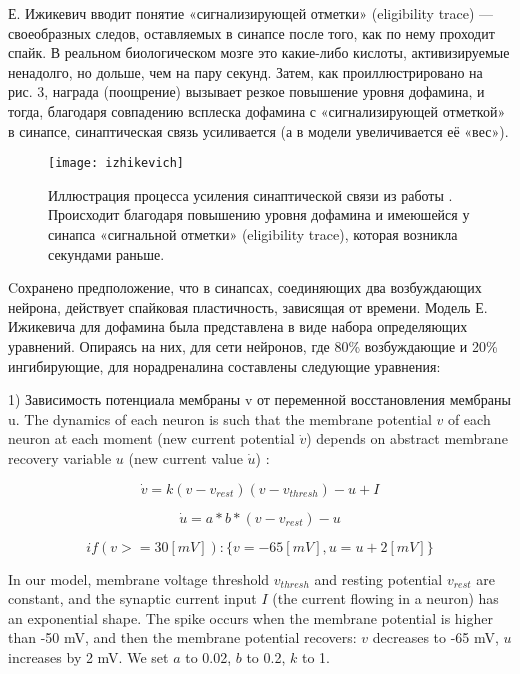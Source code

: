 Е. Ижикевич вводит понятие «сигнализирующей отметки» (eligibility trace) — своеобразных следов, оставляемых в синапсе после того, как по нему проходит спайк. В реальном биологическом мозге это какие-либо кислоты, активизируемые ненадолго, но дольше, чем на пару секунд. Затем, как проиллюстрировано на рис. 3, награда (поощрение) вызывает резкое повышение уровня дофамина, и тогда, благодаря совпадению всплеска дофамина с «сигнализирующей отметкой» в синапсе, синаптическая связь усиливается (а в модели увеличивается её «вес»).


\begin{figure}
	\centering
	\texttt{[image: izhikevich]}
	\caption{Иллюстрация процесса усиления синаптической связи из работы \cite{izh}. Происходит благодаря повышению уровня дофамина и имеюшейся у синапса «сигнальной отметки» (eligibility trace), которая возникла секундами раньше.}
	\label{fig:sample_figure}
\end{figure}


Cохранено предположение, что в синапсах, соединяющих два возбуждающих нейрона, действует спайковая пластичность, зависящая от времени. Модель Е. Ижикевича для дофамина была представлена в виде набора определяющих уравнений. Опираясь на них, для сети нейронов, где 80\% возбуждающие и 20\% ингибирующие, для норадреналина составлены следующие уравнения:


1) Зависимость потенциала мембраны v от переменной восстановления мембраны u. The dynamics of each neuron is such that the membrane potential $v$ of each neuron at each moment (new current potential $\dot{v}$) depends on abstract membrane recovery variable $u$ (new current value $\dot{u}$) \cite{tactile}:

\begin{equation} \label{eq:1}
\dot{v} = k (v - v_{rest})(v - v_{thresh}) - u + I
\end{equation}


\begin{equation} \label{eq:2}
\dot{u}=  a*b*(v - v_{rest}) - u
\end{equation}


\begin{equation}\label{eq:3}
if (v >= 30 [mV]) : \{v = - 65 [mV], u = u + 2 [mV]\}
\end{equation}


In our model, membrane voltage threshold $v_{thresh}$ and resting potential $v_{rest}$ are constant, and the synaptic current input $I$ (the current flowing in a neuron) has an exponential shape.
The spike occurs when the membrane potential is higher than -50 mV, and then the membrane potential recovers: $v$ decreases to -65 mV, $u$ increases by 2 mV. 
We set $a$ to 0.02, $b$ to 0.2, $k$ to 1. 

